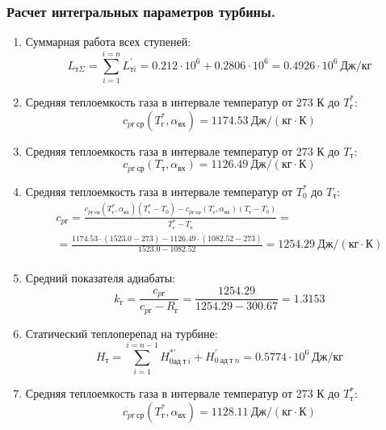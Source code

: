 \documentclass[a4paper,12pt]{article}
\begin{document}
    \subsubsection{Расчет интегральных параметров турбины.}
%     
%    
    \begin{enumerate}

        \item Суммарная работа всех ступеней:
        \[
            L_{т\Sigma} = \sum_{i=1}^{i=n}{L_{тi}^{\prime}} =
            0.212\cdot 10^6+0.2806\cdot 10^6 = 0.4926 \cdot 10^6 \ Дж/кг
        \]

        \item Средняя теплоемкость газа в интервале температур от 273 К до $T_г^*$:
        \[
            c_{pг\ ср} (T_г^*, \alpha_{вх}) =
            1174.53 \ Дж/(кг \cdot К)
        \]

        \item Средняя теплоемкость газа в интервале температур от 273 К до $T_т$:
        \[
            c_{pг\ ср} (T_т, \alpha_{вх}) =
            1126.49 \ Дж/(кг \cdot К)
        \]

        \item Средняя теплоемкость газа в интервале температур от $T_0^*$ до $T_т$:
        \begin{gather*}
            c_{pг} = \frac{
		         c_{pг\ ср} (T_г^*, \alpha_{вх}) (T_г^* - T_0) - c_{pг\ ср} (T_{т}, \alpha_{вх})(T_т - T_0)
		    }{
		        T_г^* - T_т} =\\
            =\frac{
                1174.53 \cdot
                (1523.0 - 273) -
		        1126.49 \cdot
                (1082.52 - 273)
		    }{
		        1523.0 - 1082.52} =
		    1254.29 \ Дж / (кг \cdot К)\\
        \end{gather*}

        \item Средний показателя адиабаты:
        \[
            k_г = \frac{c_{pг}}{c_{pг} - R_г} =
                \frac{
                    1254.29
                }{
                    1254.29 - 300.67
                }
            = 1.3153
        \]

        \item Статический теплоперепад на турбине:
        \[
            H_т = \sum_{i=1}^{i=n-1}H_{0ад\ т\ i}^{*\prime} + H_{0\ ад\ т\ n}^\prime =
            0.5774 \cdot 10^6 \ Дж/кг
        \]

        \item Средняя теплоемкость газа в интервале температур от 273 К до $T_т^*$:
        \[
            c_{pг\ ср} (T_т^*, \alpha_{вх}) =
            1128.11 \ Дж/(кг \cdot К)
        \]


\end{enumerate}
\end{document}
